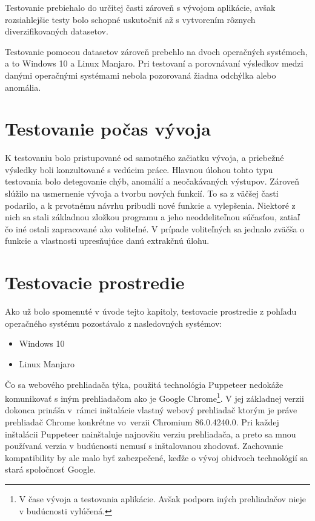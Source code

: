 Testovanie prebiehalo do určitej časti zároveň s vývojom aplikácie, avšak rozsiahlejšie testy bolo schopné uskutočniť až s vytvorením rôznych diverzifikovaných datasetov.

Testovanie pomocou datasetov zároveň prebehlo na dvoch operačných systémoch, a to Windows 10 a Linux Manjaro. Pri testovaní a porovnávaní výsledkov medzi danými operačnými systémami nebola pozorovaná žiadna odchýlka alebo anomália. 

\section{Testovanie počas vývoja}

K testovaniu bolo pristupované od samotného začiatku vývoja, a priebežné výsledky boli konzultované s vedúcim práce. Hlavnou úlohou tohto typu testovania bolo detegovanie chýb, anomálií a neočakávaných výstupov. Zároveň slúžilo na usmernenie vývoja a tvorbu nových funkcií. To sa z väčšej časti podarilo, a k prvotnému návrhu pribudli nové funkcie a vylepšenia. Niektoré z nich sa stali základnou zložkou programu a jeho neoddeliteľnou súčasťou, zatiaľ čo iné ostali zapracované ako voliteľné. V prípade voliteľných sa jednalo zväčša o funkcie a vlastnosti upresňujúce danú extrakčnú úlohu.

\section{Testovacie prostredie}

Ako už bolo spomenuté v úvode tejto kapitoly, testovacie prostredie z pohľadu operačného systému pozostávalo z nasledovných systémov:

\begin{itemize}
    \item Windows 10
    \item Linux Manjaro
\end{itemize}

\newpage

Čo sa webového prehliadača týka, použitá technológia Puppeteer nedokáže komunikovať s iným prehliadačom ako je Google Chrome\footnote{V čase vývoja a testovania aplikácie. Avšak podpora iných prehliadačov nieje v budúcnosti vylúčená.}. V jej základnej verzii dokonca prináša v~rámci inštalácie vlastný webový prehliadač ktorým je práve prehliadač Chrome konkrétne vo~verzii Chromium 86.0.4240.0. Pri každej inštalácii Puppeteer nainštaluje najnovšiu verziu prehliadača, a preto sa mnou používaná verzia v budúcnosti nemusí s inštalovanou zhodovať. Zachovanie kompatibility by ale malo byť zabezpečené, keďže o vývoj obidvoch technológií sa stará spoločnosť Google.

